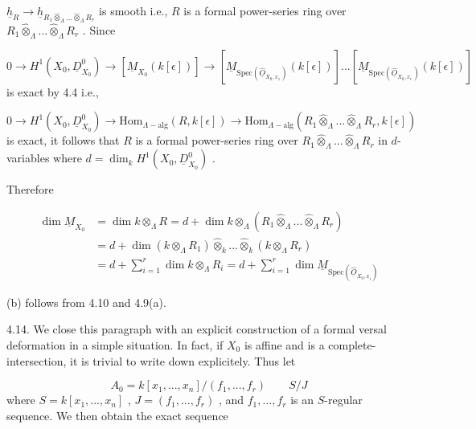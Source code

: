 $\underline{h}_R \to \underline{h}_{R_1 \widehat{\otimes}_\Lambda ... \widehat{\otimes}_\Lambda R_r}$   is smooth i.e.,  $R$  is a formal power-series ring over  $R_1 \widehat{\otimes}_\Lambda ... \widehat{\otimes}_\Lambda R_r$ . Since

\begin{equation*}
0 \to H^1(X_0,\underline{D}^0_{X_0}) \to [\underline{M}_{X_0}(k[\epsilon])] \to [\underline{M}_{\mathrm{Spec}(\widehat{\underline{O}}_{X_0,x_1})}(k[\epsilon])] ... [\underline{M}_{\mathrm{Spec}(\widehat{\underline{O}}_{X_0,x_r})}(k[\epsilon])]
\end{equation*}
is exact by 4.4 i.e.,

\begin{equation*}
0 \to H^1(X_0, \underline{D}^0_{X_0}) \to \mathrm{Hom}_{\Lambda-\mathrm{alg}}(R, k[\epsilon]) \to \mathrm{Hom}_{\Lambda-\mathrm{alg}}(R_1 \widehat{\otimes}_\Lambda ... \widehat{\otimes}_\Lambda R_r, k[\epsilon])
\end{equation*}
is exact, it follows that  $R$  is a formal power-series ring over    $R_1 \widehat{\otimes}_\Lambda ... \widehat{\otimes}_\Lambda R_r$ in $d$-variables where  $d = \dim_k H^1(X_0, \underline{D}^0_{X_0})$  .

Therefore

\begin{equation*}
\begin{aligned}
\dim \underline{M}_{X_0} &= \dim k \otimes_\Lambda R = d + \dim k \otimes_\Lambda (R_1 \widehat{\otimes}_\Lambda ... \widehat{\otimes}_\Lambda R_r) \\
&= d + \dim(k \otimes_\Lambda R_1) \widehat{\otimes}_k ... \widehat{\otimes}_k (k \otimes_\Lambda R_r) \\
&= d + \sum_{i=1}^{r} \dim k \otimes_\Lambda R_i = d + \sum_{i=1}^{r} \dim \underline{M}_{\mathrm{Spec}(\widehat{\underline{O}}_{X_0,x_i})}
\end{aligned}
\end{equation*}


(b)  follows from 4.10 and 4.9(a).

4.14.    We close this paragraph with an explicit construction of a formal versal deformation in a simple situation. In fact, if  $X_0$  is affine and is a complete-intersection, it is trivial to write down explicitely. Thus let

\begin{equation*}
A_0 = k[x_1,...,x_n]/(f_1,...,f_r) \qquad S/J
\end{equation*}
where  $S = k[x_1,...,x_n]$  ,  $J = (f_1,...,f_r)$  , and  $f_1,...,f_r$  is an $S$-regular sequence. We then obtain the exact sequence

